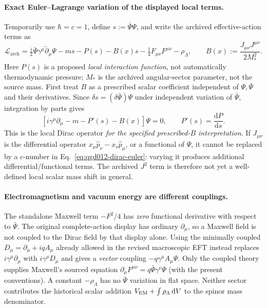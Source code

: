 \documentclass[11pt,a4paper]{article}
\newcommand{\dd}{\mathrm d}
\begin{document}
\paragraph{Exact Euler--Lagrange variation of the displayed local terms.}
Temporarily use $\hbar=c=1$, define $s:=\bar\Psi\Psi$, and write the archived effective-action terms as
\begin{equation}\label{eq:qgd012-archive-action}
 \mathcal L_{\mathrm{arch}}=
 \tfrac{i}{2}\bar\Psi\gamma^\mu\overleftrightarrow{\partial}_\mu\Psi
 -ms-P(s)-B(x)s-\tfrac14F_{\mu\nu}F^{\mu\nu}-\rho_\Lambda,
 \qquad B(x):=\frac{J_{\mu\nu}J^{\mu\nu}}{2M_*^2}.
\end{equation}
Here $P(s)$ is a proposed \emph{local interaction function}, not automatically thermodynamic pressure; $M_*$ is the archived angular-sector parameter, not the source mass. First treat $B$ as a prescribed scalar coefficient independent of $\Psi,\bar\Psi$ and their derivatives. Since $\delta s=(\delta\bar\Psi)\Psi$ under independent variation of $\bar\Psi$, integration by parts gives
\begin{equation}\label{eq:qgd012-dirac-euler}
\boxed{\left[i\gamma^\mu\partial_\mu-m-P'(s)-B(x)\right]\Psi=0,\qquad P'(s)=\frac{\dd P}{\dd s}.}
\end{equation}
This is the local Dirac operator \emph{for the specified prescribed-$B$ interpretation}. If $J_{\mu\nu}$ is the differential operator $x_\mu\hat p_\nu-x_\nu\hat p_\mu$, or a functional of $\Psi$, it cannot be replaced by a $c$-number in Eq.~\eqref{eq:qgd012-dirac-euler}: varying it produces additional differential/functional terms. The archived $J^2$ term is therefore not yet a well-defined local scalar mass shift in general.

\paragraph{Electromagnetism and vacuum energy are different couplings.}
The standalone Maxwell term $-F^2/4$ has \emph{zero} functional derivative with respect to $\bar\Psi$. The original complete-action display has ordinary $\partial_\mu$, so a Maxwell field is not coupled to the Dirac field by that display alone. Using the minimally coupled $D_\mu=\partial_\mu+iqA_\mu$ already allowed in the revised macroscopic EFT instead replaces $i\gamma^\mu\partial_\mu$ with $i\gamma^\mu D_\mu$ and gives a \emph{vector} coupling $-q\gamma^\mu A_\mu\Psi$. Only the coupled theory supplies Maxwell's sourced equation $\partial_\mu F^{\mu\nu}=q\bar\Psi\gamma^\nu\Psi$ (with the present conventions). A constant $-\rho_\Lambda$ has no $\bar\Psi$ variation in flat space. Neither sector contributes the historical scalar addition $V_{\rm EM}+\int\rho_\Lambda\,\dd V$ to the spinor mass denominator.
\end{document}
